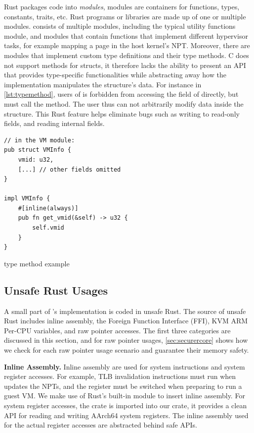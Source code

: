 Rust packages code into \textit{modules}, modules are containers for functions,
types, constants, traits, etc. Rust programs or libraries are made up of one or
multiple modules.
\rustcore{} consists of multiple modules, including the typical utility
functions module, and modules that contain functions that implement different
hypervisor tasks, for example mapping a page in the host kernel's NPT.
Moreover, there are modules that implement custom type definitions and their
type methods. C does not support methods for structs, it therefore lacks the
ability to present an API that provides type-specific functionalities while
abstracting away how the implementation manipulates the structure's data.
For instance in \autoref{lst:typemethod}, users of  is forbidden
from accessing the  field of  directly, but must call
the  method. The user thus can not arbitrarily modify data
inside the structure. This Rust feature helps eliminate bugs such as writing to
read-only fields, and reading internal fields.

\begin{listing}[ht]
    \begin{verbatim}
// in the VM module:
pub struct VMInfo {
    vmid: u32,
    [...] // other fields omitted
}

impl VMInfo {
    #[inline(always)]
    pub fn get_vmid(&self) -> u32 {
        self.vmid
    }
}
    \end{verbatim}
    \caption{type method example}
    \label{lst:typemethod}
    \vspace{-0.2cm}
\end{listing}

\subsection{Unsafe Rust Usages}

A small part of \rustcore{}'s implementation is coded in unsafe Rust.
The source of unsafe Rust includes inline assembly, the Foreign Function
Interface (FFI), KVM ARM Per-CPU variables, and raw pointer accesses.
The first three categories are discussed in this section,
and for raw pointer usages, \autoref{sec:securercore} shows how we check for
each raw pointer usage scenario and guarantee their memory safety.

\textbf{Inline Assembly.}
Inline assembly are used for system instructions and system register accesses.
For example, TLB invalidation instructions must run when \rustcore{} updates the
NPTs, and the  register must be switched when preparing to run
a guest VM.
We make use of Rust's built-in module  to insert inline
assembly. For system register accesses, the  crate
\cite{aarch64cpu} is imported into our \rustcore{} crate, it provides a clean
API for reading and writing AArch64 system registers. The inline assembly used
for the actual register accesses are abstracted behind safe APIs.

